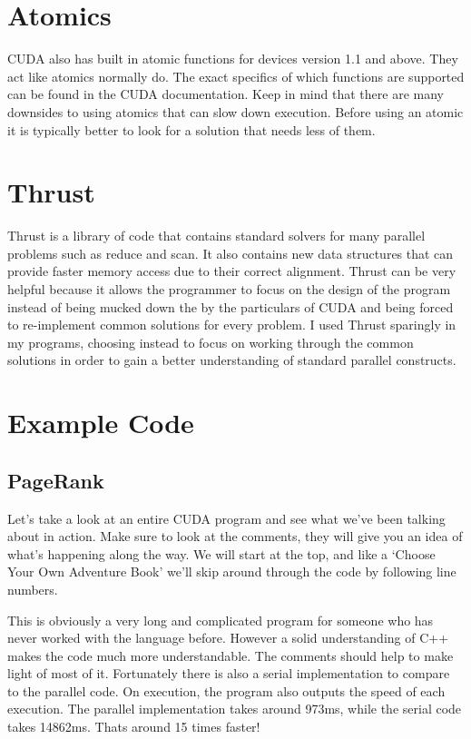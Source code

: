 \documentclass{article}
\begin{document}
	\section{Atomics}
    CUDA also has built in atomic functions for devices version 1.1 and above. They act like atomics normally do. The exact specifics of which functions are supported can be found in the CUDA documentation. Keep in mind that there are many downsides to using atomics that can slow down execution. Before using an atomic it is typically better to look for a solution that needs less of them.



  \section{Thrust}
  Thrust is a library of code that contains standard solvers for many parallel problems such as reduce and scan. It also contains new data structures that can provide faster memory access due to their correct alignment. Thrust can be very helpful because it allows the programmer to focus on the design of the program instead of being mucked down the by the particulars of CUDA and being forced to re-implement common solutions for every problem. I used Thrust sparingly in my programs, choosing instead to focus on working through the common solutions in order to gain a better understanding of standard parallel constructs.


  \section{Example Code}
  \subsection{PageRank}
  Let's take a look at an entire CUDA program and see what we've been talking about in action. Make sure to look at the comments, they will give you an idea of what's happening along the way. We will start at the top, and like a `Choose Your Own Adventure Book' we'll skip around through the code by following line numbers.
  
  

  This is obviously a very long and complicated program for someone who has never worked with the language before. However a solid understanding of C++ makes the code much more understandable. The comments should help to make light of most of it. Fortunately there is also a serial implementation to compare to the parallel code. On execution, the program also outputs the speed of each execution. The parallel implementation takes around 973ms, while the serial code takes 14862ms. Thats around 15 times faster!
\end{document}

